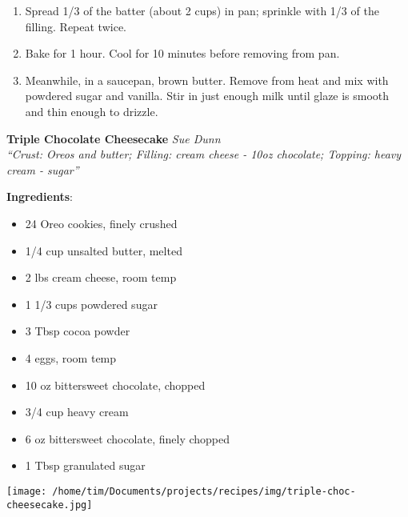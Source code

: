 \documentclass[11pt, twoside, openany]{book}
\begin{document}
\begin{minipage}[t]{\linewidth}
\begin{enumerate}
\item Spread 1/3 of the batter (about 2 cups) in pan; sprinkle with 1/3 of the filling. Repeat twice.
\item Bake for 1 hour. Cool for 10 minutes before removing from pan.
\item Meanwhile, in a saucepan, brown butter. Remove from heat and mix with powdered sugar and vanilla. Stir in just enough milk until glaze is smooth and thin enough to drizzle.
\end{enumerate}
\end{minipage}\vspace{8mm}
\noindent\begin{minipage}[t]{\linewidth}%
{\Large\textbf{Triple Chocolate Cheesecake}} \label{triple-chocolate-cheesecake}\hfill\textit{Sue Dunn}\\
\textit{``Crust: Oreos and butter; Filling: cream cheese - 10oz chocolate; Topping: heavy cream - sugar''}\\
\noindent\begin{minipage}[t]{0.78\linewidth}%
\textbf{Ingredients}:\vspace{-3mm}
\begin{multicols}{2}
\begin{itemize}\setlength\itemsep{-1mm}
\item 24 Oreo cookies, finely crushed
\item 1/4 cup unsalted butter, melted
\item 2 lbs cream cheese, room temp
\item 1 1/3 cups powdered sugar
\item 3 Tbsp cocoa powder
\item 4 eggs, room temp
\item 10 oz bittersweet chocolate, chopped
\item 3/4 cup heavy cream
\item 6 oz bittersweet chocolate, finely chopped
\item 1 Tbsp granulated sugar
\end{itemize}
\end{multicols}
\end{minipage}
\noindent\begin{minipage}[t]{0.18\linewidth}
\centering \strut\vspace*{-\baselineskip}\newline
\texttt{[image: /home/tim/Documents/projects/recipes/img/triple-choc-cheesecake.jpg]}\\
\end{minipage}\vspace{3mm}

\end{minipage}
\end{document}
